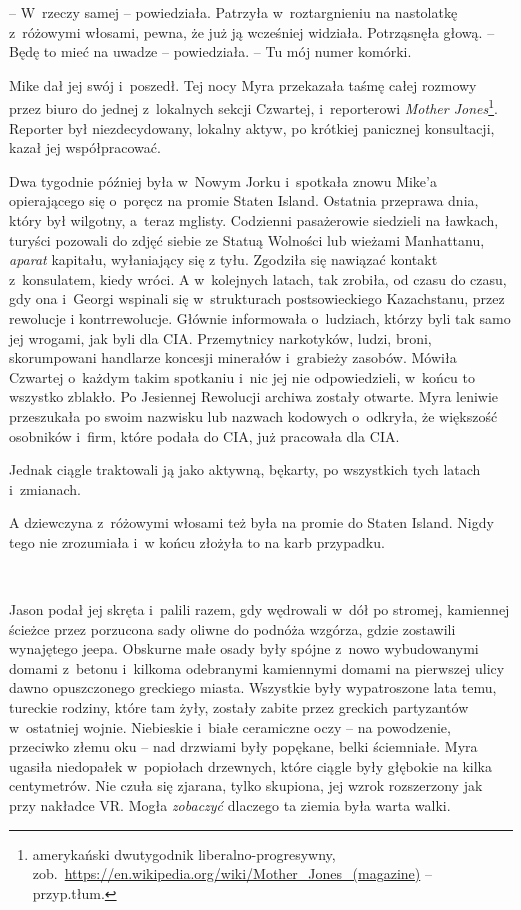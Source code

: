 \documentclass[oneside,polish,11pt,sfheadings]{mwbk}
\begin{document}
-- W~rzeczy samej -- powiedziała. Patrzyła w~roztargnieniu na nastolatkę z~różowymi włosami, pewna, że już ją wcześniej widziała. Potrząsnęła
głową. -- Będę to mieć na uwadze -- powiedziała. -- Tu mój numer komórki.

Mike dał jej swój i~poszedł. Tej nocy Myra przekazała taśmę całej
rozmowy przez biuro do jednej z~lokalnych sekcji Czwartej, i~reporterowi
\textit{Mother Jones}\footnote{ amerykański dwutygodnik liberalno-progresywny,
zob.~\url{https://en.wikipedia.org/wiki/Mother\_Jones\_(magazine)}
-- przyp.tłum.}. Reporter był niezdecydowany, lokalny aktyw, po krótkiej
panicznej konsultacji, kazał jej współpracować.

Dwa tygodnie później była w~Nowym Jorku i~spotkała znowu Mike'a
opierającego się o~poręcz na promie Staten Island. Ostatnia przeprawa
dnia, który był wilgotny, a~teraz mglisty. Codzienni pasażerowie
siedzieli na ławkach, turyści pozowali do zdjęć siebie ze Statuą
Wolności lub wieżami Manhattanu, \textit{aparat} kapitału, wyłaniający się
z tyłu. Zgodziła się nawiązać kontakt z~konsulatem, kiedy wróci. A w~kolejnych latach, tak zrobiła, od czasu do czasu, gdy ona i~Georgi
wspinali się w~strukturach postsowieckiego Kazachstanu, przez rewolucje
i kontrrewolucje. Głównie informowała o~ludziach, którzy byli tak samo
jej wrogami, jak byli dla CIA. Przemytnicy narkotyków, ludzi, broni,
skorumpowani handlarze koncesji minerałów i~grabieży zasobów. Mówiła
Czwartej o~każdym takim spotkaniu i~nic jej nie odpowiedzieli, w~końcu
to wszystko zblakło. Po Jesiennej Rewolucji archiwa zostały otwarte.
Myra leniwie przeszukała po swoim nazwisku lub nazwach kodowych o~odkryła, że większość osobników i~firm, które podała do CIA, już
pracowała dla CIA.

Jednak ciągle traktowali ją jako aktywną, bękarty, po wszystkich tych
latach i~zmianach.

A dziewczyna z~różowymi włosami też była na promie do Staten Island.
Nigdy tego nie zrozumiała i~w końcu złożyła to na karb przypadku.

~

Jason podał jej skręta i~palili razem, gdy wędrowali w~dół po stromej,
kamiennej ścieżce przez porzucona sady oliwne do podnóża wzgórza, gdzie
zostawili wynajętego jeepa. Obskurne małe osady były spójne z~nowo
wybudowanymi domami z~betonu i~kilkoma odebranymi kamiennymi domami na
pierwszej ulicy dawno opuszczonego greckiego miasta. Wszystkie były
wypatroszone lata temu, tureckie rodziny, które tam żyły, zostały zabite
przez greckich partyzantów w~ostatniej wojnie. Niebieskie i~białe
ceramiczne oczy -- na powodzenie, przeciwko złemu oku -- nad drzwiami były
popękane, belki ściemniałe. Myra ugasiła niedopałek w~popiołach
drzewnych, które ciągle były głębokie na kilka centymetrów. Nie czuła
się zjarana, tylko skupiona, jej wzrok rozszerzony jak przy nakładce VR.
Mogła \textit{zobaczyć} dlaczego ta ziemia była warta walki.
\end{document}
